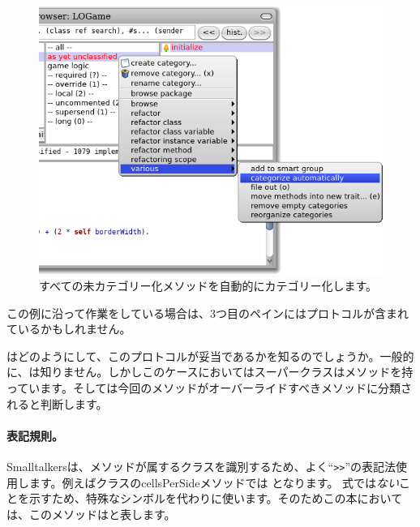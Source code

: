 \documentclass[a4paper,10pt,twoside]{book}
\begin{document}
\begin{figure}[htbp]
   \centering
   \includegraphics[width=\textwidth]{Categorize} 
   \caption{すべての未カテゴリー化メソッドを自動的にカテゴリー化します。}
\end{figure}

この例に沿って作業をしている場合は、3つ目のペインにはプロトコルが含まれているかもしれません。

\pharo{}はどのようにして、このプロトコルが妥当であるかを知るのでしょうか。一般的に、\pharo{}は知りません。しかしこのケースにおいてはスーパークラスはメソッドを持っています。そして\pharo{}は今回のメソッドがオーバーライドすべきメソッドに分類されると判断します。


\paragraph{表記規則。} Smalltalkersは、メソッドが属するクラスを識別するため、よく``\verb|>>|''の表記法使用します。例えばクラスのcellsPerSideメソッドでは となります。
\st{}式では\emph{ない}ことを示すため、特殊なシンボル\ct{>>>}を代わりに使います。そのためこの本においては、このメソッドはと表します。
\end{document}
